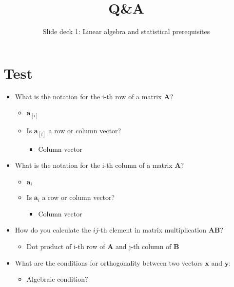 \documentclass[
  letterpaper,
  DIV=11,
  numbers=noendperiod]{scrartcl}
\title{Q\&A}
\subtitle{Slide deck 1: Linear algebra and statistical prerequisites}
\author{}
\date{}
\providecommand{\tightlist}{%
  \setlength{\itemsep}{0pt}\setlength{\parskip}{0pt}}\usepackage{longtable,booktabs,array}
\begin{document}
\maketitle


\section{Test}\label{test}

\begin{itemize}
\tightlist
\item
  What is the notation for the i-th row of a matrix \(\symbf{A}\)?

  \begin{itemize}
  \tightlist
  \item
    \(\symbf{a}_{[i]}\)
  \item
    Is \(\symbf{a}_{[i]}\) a row or column vector?

    \begin{itemize}
    \tightlist
    \item
      Column vector
    \end{itemize}
  \end{itemize}
\item
  What is the notation for the i-th column of a matrix \(\symbf{A}\)?

  \begin{itemize}
  \tightlist
  \item
    \(\symbf{a}_{i}\)
  \item
    Is \(\symbf{a}_{i}\) a row or column vector?

    \begin{itemize}
    \tightlist
    \item
      Column vector
    \end{itemize}
  \end{itemize}
\item
  How do you calculate the \(ij\)-th element in matrix multiplication
  \(\symbf{AB}\)?

  \begin{itemize}
  \tightlist
  \item
    Dot product of i-th row of \(\symbf{A}\) and j-th column of
    \(\symbf{B}\)
  \end{itemize}
\item
  What are the conditions for orthogonality between two vectors
  \(\symbf{x}\) and \(\symbf{y}\):

  \begin{itemize}
  \tightlist
  \item
    Algebraic condition?


\end{itemize}
\end{itemize}
\end{document}
